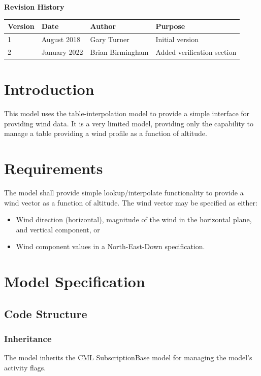\documentclass[11pt,fleqn]{report}
\begin{document}
\pagestyle{empty}
\titlePage
{}
\tableofcontents %
\vfill

{\Large \textbf {Revision History}}

\begin{tabular}{| m{}| m{} | m{} | m{} |} \hline
 \textbf{Version} & \textbf{Date} & \textbf{Author} & \textbf{Purpose} \\
\hline 
1 & August 2018 & Gary Turner & Initial version \\ \hline
2 & January 2022 & Brian Birmingham & Added verification section \\ \hline
\end{tabular}


\chapter{Introduction} %
\pagestyle{plain}
This model uses the table-interpolation model to provide a simple interface for providing wind data.  It is a very limited model, providing only the capability to manage a table providing a wind profile as a function of altitude.


\chapter{Requirements}
The model shall provide simple lookup/interpolate functionality to provide a wind vector as a function of altitude.  The wind vector may be specified as either:
\begin{itemize}
	\item Wind direction (horizontal), magnitude of the wind in the horizontal plane, and vertical component, or
	\item Wind component values in a North-East-Down specification.
\end{itemize}




\chapter{Model Specification}
\section{Code Structure}
\subsection{Inheritance}
The model inherits the CML SubscriptionBase model for managing the model's activity flags.
\end{document}
